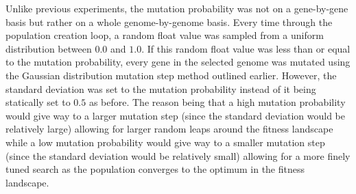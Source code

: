 \documentclass[a4paper,10pt]{article}
\begin{document}
\vspace{3mm}

Unlike previous experiments, the mutation probability was not on a gene-by-gene basis but rather on a whole genome-by-genome basis. Every time through the population creation loop, a random float value was sampled from a uniform distribution between $0.0$ and $1.0$. If this random float value was less than or equal to the mutation probability, every gene in the selected genome was mutated using the Gaussian distribution mutation step method outlined earlier. However, the standard deviation was set to the mutation probability instead of it being statically set to $0.5$ as before. The reason being that a high mutation probability would give way to a larger mutation step (since the standard deviation would be relatively large) allowing for larger random leaps around the fitness landscape while a low mutation probability would give way to a smaller mutation step (since the standard deviation would be relatively small) allowing for a more finely tuned search as the population converges to the optimum in the fitness landscape.
\end{document}

